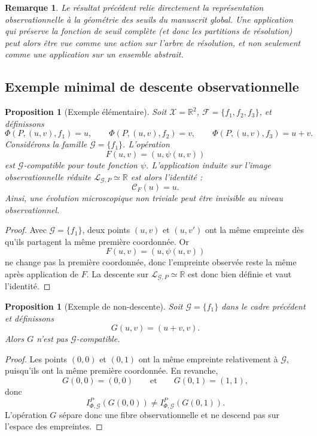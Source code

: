 \documentclass[11pt,a4paper,openany]{book}
\newtheorem{proposition}[definition]{Proposition}
\newtheorem{remark}[definition]{Remarque}
\begin{document}
\begin{remark}
Le résultat précédent relie directement la représentation observationnelle à la géométrie des seuils du manuscrit global. Une application qui préserve la fonction de seuil complète (et donc les partitions de résolution) peut alors être vue comme une action sur l'arbre de résolution, et non seulement comme une application sur un ensemble abstrait.
\end{remark}

\subsection{Exemple minimal de descente observationnelle}

\begin{proposition}[Exemple élémentaire]
Soit \(\mathcal X=\mathbb R^2\), \(\mathcal F=\{f_1,f_2,f_3\}\), et définissons
\[
\Phi(P,(u,v),f_1)=u,\qquad
\Phi(P,(u,v),f_2)=v,\qquad
\Phi(P,(u,v),f_3)=u+v.
\]
Considérons la famille \(\mathcal G=\{f_1\}\). L'opération
\[
F(u,v)=(u,\psi(u,v))
\]
est \(\mathcal G\)-compatible pour toute fonction \(\psi\). L'application induite sur l'image observationnelle réduite \(\mathcal L_{\mathcal G,P}\simeq\mathbb R\) est alors l'identité :
\[
\mathcal C_F(u)=u.
\]
Ainsi, une évolution microscopique non triviale peut être invisible au niveau observationnel.
\end{proposition}

\begin{proof}
Avec \(\mathcal G=\{f_1\}\), deux points \((u,v)\) et \((u,v')\) ont la même empreinte dès qu'ils partagent la même première coordonnée. Or
\[
F(u,v)=(u,\psi(u,v))
\]
ne change pas la première coordonnée, donc l'empreinte observée reste la même après application de \(F\). La descente sur \(\mathcal L_{\mathcal G,P}\simeq\mathbb R\) est donc bien définie et vaut l'identité.
\end{proof}

\begin{proposition}[Exemple de non-descente]
Soit \(\mathcal G=\{f_1\}\) dans le cadre précédent et définissons
\[
G(u,v)=(u+v,v).
\]
Alors \(G\) n'est pas \(\mathcal G\)-compatible.
\end{proposition}

\begin{proof}
Les points \((0,0)\) et \((0,1)\) ont la même empreinte relativement à \(\mathcal G\), puisqu'ils ont la même première coordonnée. En revanche,
\[
G(0,0)=(0,0)
\qquad\text{et}\qquad
G(0,1)=(1,1),
\]
donc
\[
I_{\Phi,\mathcal G}^P(G(0,0))\neq I_{\Phi,\mathcal G}^P(G(0,1)).
\]
L'opération \(G\) sépare donc une fibre observationnelle et ne descend pas sur l'espace des empreintes.
\end{proof}
\end{document}
